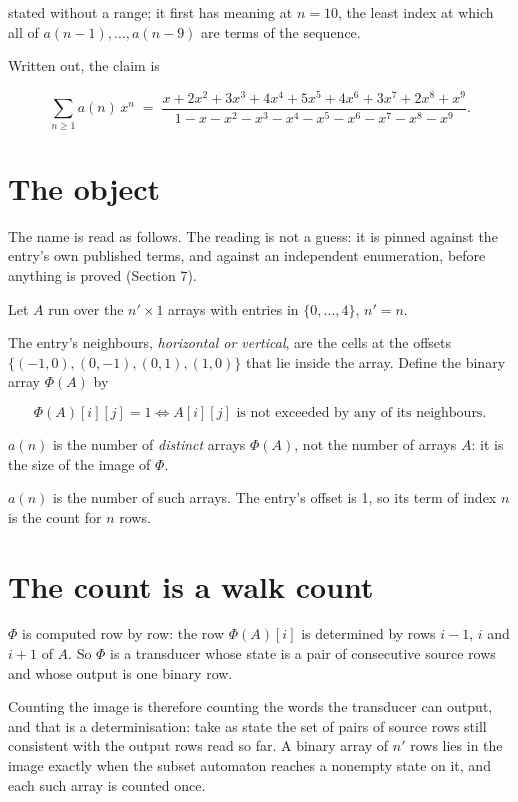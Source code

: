 \documentclass[11pt]{article}
\theoremstyle{definition}
\begin{document}
stated without a range; it first has meaning at $n = 10$, the least index at which all of $a(n-1),\dots,a(n-9)$ are terms of the sequence.

Written out, the claim is

\[\sum_{n \ge 1} a(n)\,x^n \;=\; \frac{x + 2x^{2} + 3x^{3} + 4x^{4} + 5x^{5} + 4x^{6} + 3x^{7} + 2x^{8} + x^{9}}{1 - x - x^{2} - x^{3} - x^{4} - x^{5} - x^{6} - x^{7} - x^{8} - x^{9}}.\]

\section{The object}

The name is read as follows. The reading is not a guess: it is pinned against the entry's own published terms, and against an independent enumeration, before anything is proved (Section 7).

Let $A$ run over the $n' \times 1$ arrays with entries in $\{0,\dots,4\}$, $n' = n$.

The entry's neighbours, {\itshape horizontal or vertical}, are the cells at the offsets $\{(-1,0), (0,-1), (0,1), (1,0)\}$ that lie inside the array. Define the binary array $\Phi(A)$ by

\[\Phi(A)[i][j] = 1 \iff A[i][j] \text{ is not exceeded by any of its neighbours}.\]

$a(n)$ is the number of {\itshape distinct} arrays $\Phi(A)$, not the number of arrays $A$: it is the size of the image of $\Phi$.

$a(n)$ is the number of such arrays. The entry's offset is 1, so its term of index $n$ is the count for $n$ rows.

\section{The count is a walk count}

$\Phi$ is computed row by row: the row $\Phi(A)[i]$ is determined by rows $i-1$, $i$ and $i+1$ of $A$. So $\Phi$ is a transducer whose state is a pair of consecutive source rows and whose output is one binary row.

Counting the image is therefore counting the words the transducer can output, and that is a determinisation: take as state the set of pairs of source rows still consistent with the output rows read so far. A binary array of $n'$ rows lies in the image exactly when the subset automaton reaches a nonempty state on it, and each such array is counted once.
\end{document}
